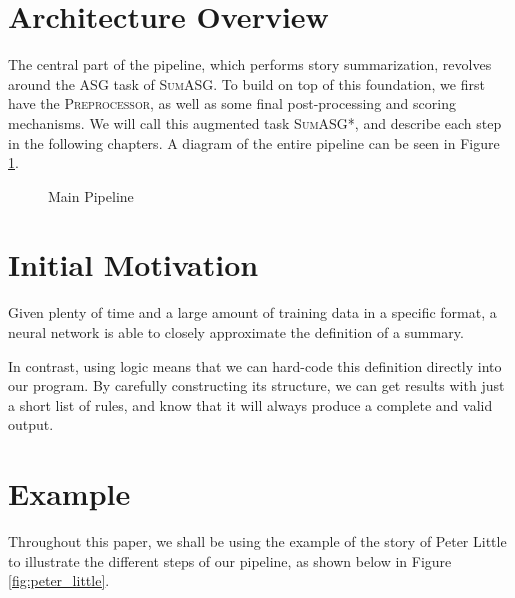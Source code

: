 \label{chapter:contributions}

\section{Architecture Overview}

The central part of the pipeline, which performs story summarization, revolves around the ASG task of \textsc{SumASG}. To build on top of this foundation, we first have the \textsc{Preprocessor}, as well as some final post-processing and scoring mechanisms. We will call this augmented task \textsc{SumASG*}, and describe each step in the following chapters. A diagram of the entire pipeline can be seen in Figure \ref{fig:main_pipeline}.

\begin{figure}[H]
\centering
{}
\caption{Main Pipeline}
\label{fig:main_pipeline}
\end{figure}

\section{Initial Motivation}

Given plenty of time and a large amount of training data in a specific format, a neural network is able to closely approximate the definition of a summary.

In contrast, using logic means that we can hard-code this definition directly into our program. By carefully constructing its structure, we can get results with just a short list of rules, and know that it will always produce a complete and valid output.

\section{Example}

Throughout this paper, we shall be using the example of the story of Peter Little to illustrate the different steps of our pipeline, as shown below in Figure \ref{fig:peter_little}.

